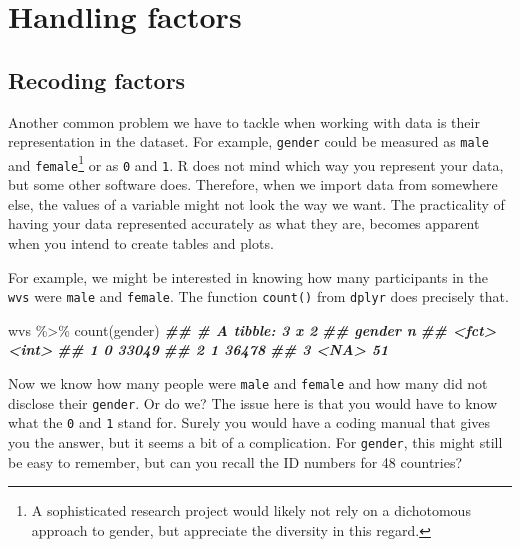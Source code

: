 \documentclass[
]{book}
\newenvironment{Shaded}{\begin{snugshade}}{\end{snugshade}}
\newcommand{\DocumentationTok}[1]{\textcolor[rgb]{0.56,0.35,0.01}{\textbf{\textit{#1}}}}
\newcommand{\FunctionTok}[1]{\textcolor[rgb]{0.00,0.00,0.00}{#1}}
\newcommand{\NormalTok}[1]{#1}
\newcommand{\SpecialCharTok}[1]{\textcolor[rgb]{0.00,0.00,0.00}{#1}}
\begin{document}
\hypertarget{handling-factors}{%
\section{Handling factors}\label{handling-factors}}

\hypertarget{recoding-factors}{%
\subsection{Recoding factors}\label{recoding-factors}}

Another common problem we have to tackle when working with data is their representation in the dataset. For example, \texttt{gender} could be measured as \texttt{male} and \texttt{female}\footnote{A sophisticated research project would likely not rely on a dichotomous approach to gender, but appreciate the diversity in this regard.} or as \texttt{0} and \texttt{1}. R does not mind which way you represent your data, but some other software does. Therefore, when we import data from somewhere else, the values of a variable might not look the way we want. The practicality of having your data represented accurately as what they are, becomes apparent when you intend to create tables and plots.

For example, we might be interested in knowing how many participants in the \texttt{wvs} were \texttt{male} and \texttt{female}. The function \texttt{count()} from \texttt{dplyr} does precisely that.

\begin{Shaded}
\begin{Highlighting}[]
\NormalTok{wvs }\SpecialCharTok{\%\textgreater{}\%} \FunctionTok{count}\NormalTok{(gender)}
\DocumentationTok{\#\# \# A tibble: 3 x 2}
\DocumentationTok{\#\#   gender     n}
\DocumentationTok{\#\#   \textless{}fct\textgreater{}  \textless{}int\textgreater{}}
\DocumentationTok{\#\# 1 0      33049}
\DocumentationTok{\#\# 2 1      36478}
\DocumentationTok{\#\# 3 \textless{}NA\textgreater{}      51}
\end{Highlighting}
\end{Shaded}

Now we know how many people were \texttt{male} and \texttt{female} and how many did not disclose their \texttt{gender}. Or do we? The issue here is that you would have to know what the \texttt{0} and \texttt{1} stand for. Surely you would have a coding manual that gives you the answer, but it seems a bit of a complication. For \texttt{gender}, this might still be easy to remember, but can you recall the ID numbers for 48 countries?
\end{document}
